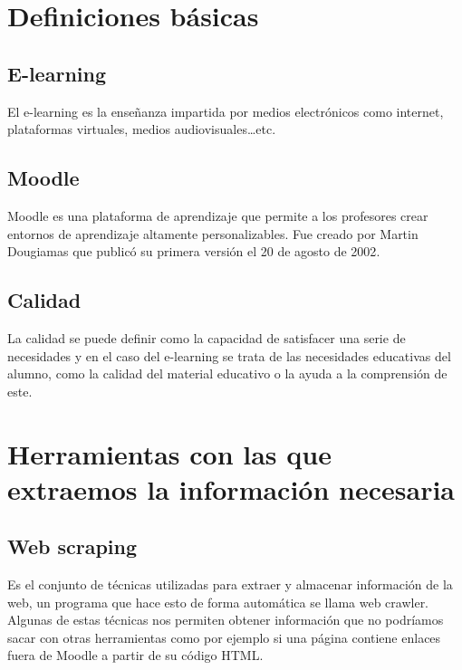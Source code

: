 

\section{Definiciones básicas}

\subsection{E-learning}

El e-learning es la enseñanza impartida por medios electrónicos como internet, plataformas virtuales, medios audiovisuales…etc.

\subsection{Moodle}

Moodle es una plataforma de aprendizaje que permite a los profesores crear entornos de aprendizaje altamente personalizables. Fue creado por Martin Dougiamas que publicó su primera versión el 20 de agosto de 2002\cite{dougiamas2002interpretive}.

\subsection{Calidad}

La calidad se puede definir como la capacidad de satisfacer una serie de necesidades y en el caso del e-learning se trata de las necesidades educativas del alumno, como la calidad del material educativo o la ayuda a la comprensión de este.

\section{Herramientas con las que extraemos la información necesaria}

\subsection{Web scraping}

Es el conjunto de técnicas utilizadas para extraer y almacenar información de la web, un programa que hace esto de forma automática se llama web crawler. Algunas de estas técnicas nos permiten obtener información que no podríamos sacar con otras herramientas como por ejemplo si una página contiene enlaces fuera de Moodle a partir de su código HTML.

